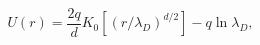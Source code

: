 \begin{equation}
\label{DHpot}
U(r)=\frac{2q}{d}K_0[(r/\lambda_D)^{d/2}]-q\ln\lambda_D,
\end{equation}


